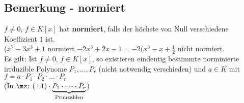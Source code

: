 	\subsection{Bemerkung - normiert}

	$f\neq 0$, $f\in K[x]$ hat \textbf{normiert}, falls der höchste von Null verschiedene Koeffizient $1$ ist.\\
	($x^7-3x^3+1$ normiert $-2x^3+2x-1=-2(x^3-x+\frac{1}{2}$ nicht normiert.\\
	Es gilt: Ist $f\neq 0$, $f\in K[x]$, so existieren eindeutig bestimmte norminierte irrduzible Polynome $P_1,...,P_r$ (nicht notwendig verschieden) und $a\in K$ mit $f=a\cdot P_1\cdot P_2\cdot\dots\cdot P_r$\\
	(In $\mz$: $(\pm 1)\cdot \underbrace{P_1\cdot\dots\cdot P_r}_{\mbox{\scriptsize Primzahlen}}$)
